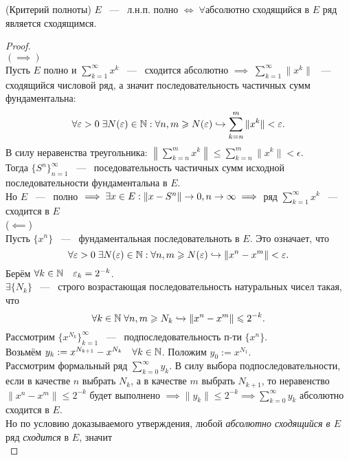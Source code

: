 \begin{theorem}
	(Критерий полноты) $E$ ~---~ л.н.п. полно $\Longleftrightarrow\; \forall$абсолютно сходящийся в $E$ ряд является сходящимся.
\end{theorem}
\begin{proof}\ \\
	$(\implies)$\\

    Пусть $E$ полно и $\sum\limits_{k=1}^\infty x^k$ ~---~ сходится абсолютно $\implies\; \sum\limits_{k=1}^\infty \|x^k\|$ ~---~ сходящийся числовой ряд, а значит последовательность частичных сумм фундаментальна: \[
			\forall \varepsilon > 0\; \exists N(\varepsilon) \in \mathbb{N}:\forall n,m \geqslant N(\varepsilon) \hookrightarrow \sum_{k=n}^{m} \|x^k\| < \varepsilon.
		\]
		В силу неравенства треугольника: $\left\|\sum\limits_{k=n}^m x^k\right\| \leq \sum\limits_{k=n}^m \|x^k\| < \epsilon$. \\
		Тогда $ \{S^n\}_{n=1}^\infty$ ~---~ поседовательность частичных сумм исходной последовательности фундаментальна в $E$.\\
		Но $E$ ~---~ полно $\implies \exists x \in E: \|x - S^n\| \rightarrow 0, n \rightarrow \infty \implies$ ряд $\sum\limits_{k=1}^\infty x^k$ ~---~ сходится в $E$\\
	($\impliedby$)\\
		Пусть $\{x^n\}$ ~---~ фундаментальная последовательноть в $E$. Это означает, что
		\[\forall \varepsilon > 0\; \exists N(\varepsilon) \in \mathbb{N}: \forall n, m \geqslant N(\varepsilon) \hookrightarrow \|x^n - x^m\| < \varepsilon.\]
		Берём $\forall k \in \mathbb{N}\quad \varepsilon_k = 2^{-k}$.\\
		$\exists \{N_k\}$ ~---~ строго возрастающая последовательность натуральных чисел такая, что \[
			\forall k \in \mathbb{N}\; \forall n, m \geqslant N_k \hookrightarrow \|x^n - x^m\| \leqslant 2^{-k}.
		\]
		Рассмотрим $\{x^{N_k}\}_{k=1}^\infty$ ~---~ подпоследовательность п-ти $\{x^n\}$.\\
		Возьмём $y_k := x^{N_{k+1}} - x^{N_k}\quad \forall k \in \mathbb{N}$. Положим $y_0 := x^{N_1}$.\\
		Рассмотрим формальный ряд $\sum\limits_{k=0}^\infty y_k$. В силу выбора подпоследовательности, если в качестве $n$ выбрать $N_k$, а в качестве $m$ выбрать $N_{k+1}$, то неравенство $\|x^n - x^m\| \leq 2^{-k}$ будет выполнено $\implies \|y_k\| \leq 2^{-k} \implies \sum\limits_{k=0}^\infty y_k$ абсолютно сходится в $E$.\\
		Но по условию доказываемого утверждения, любой \textit{абсолютно сходящийся в $E$} ряд \textit{сходится} в $E$, значит\\

\end{proof}
